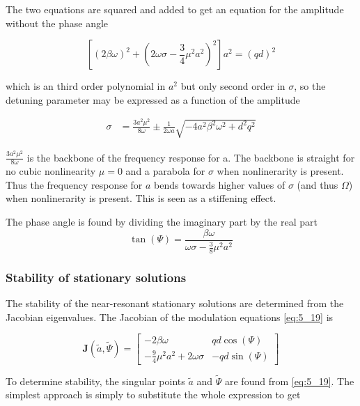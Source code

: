 The two equations are squared and added to get an equation for the amplitude
without the phase angle

\begin{equation}
  \label{eq:5_21}
  \left[ (2\beta \omega)^2 + \left( 2\omega\sigma - \frac{3}{4} \mu^2a^2 \right)^2 \right]a^2 = (qd)^2
\end{equation}


which is an third order polynomial in $a^2$ but only second order in $\sigma$, so
the detuning parameter may be expressed as a function of the amplitude

\begin{align}
  \label{eq:5_22}
  \sigma &= \frac{3a^2\mu^2}{8\omega} \pm \frac{1}{2\omega
           a}\sqrt{-4a^2\beta^2\omega^2 + d^2q^2}
\end{align}

$\frac{3a^2\mu^2}{8\omega}$ is the backbone of the frequency response for a. The
backbone is straight for no cubic nonlinearity $\mu = 0$ and a parabola for
$\sigma$ when nonlinerarity is present.
Thus the frequency response for $a$ bends towards higher values of $\sigma$ (and
thus $\Omega$) when nonlinerarity is present. This is seen as a stiffening effect.


The phase angle is found by dividing the imaginary part by the real part 
\begin{equation}
  \label{eq:5_23}
  \tan(\Psi) = \frac{\beta \omega}{\omega \sigma - \tfrac{3}{8}\mu^2a^2 }
\end{equation}


\subsubsection{Stability of stationary solutions}
\label{sec:stab-stat-solut}

The stability of the near-resonant stationary solutions are determined from the Jacobian eigenvalues.
The Jacobian of the modulation equations \eqref{eq:5_19} is

\begin{equation}
  \label{eq:5_24}
  \bm J(\tilde a, \tilde \Psi) = 
  \begin{bmatrix}
    -2\beta \omega  &  
    qd \cos(\Psi) \\
    -\frac{9}{4}\mu^2a^2 + 2\omega \sigma &
    -qd\sin(\Psi)
 \end{bmatrix}
\end{equation}

To determine stability, the singular points $\tilde a$ and $\tilde \Psi$ are
found from \ref{eq:5_19}. The simplest approach is simply to substitute the
whole expression to get

